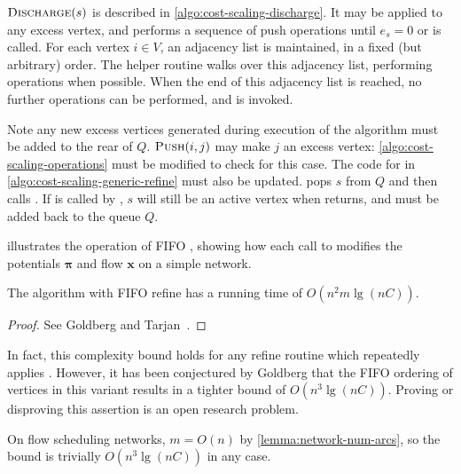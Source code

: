 $\textproc{Discharge}(s)$ is described in \cref{algo:cost-scaling-discharge}. It may be applied to any excess vertex, and performs a sequence of push operations until $e_s = 0$ or  is called. For each vertex $i \in V$, an adjacency list is maintained, in a fixed (but arbitrary) order. The helper routine  walks over this adjacency list, performing  operations when possible. When the end of this adjacency list is reached, no further  operations can be performed, and  is invoked.

Note any new excess vertices generated during execution of the algorithm must be added to the rear of $Q$. $\textproc{Push}(i,j)$ may make $j$ an excess vertex: \cref{algo:cost-scaling-operations} must be modified to check for this case. The code for  in \cref{algo:cost-scaling-generic-refine} must also be updated.  pops $s$ from $Q$ and then calls . If  is called by , $s$ will still be an active vertex when  returns, and must be added back to the queue $Q$.

 illustrates the operation of FIFO , showing how each call to  modifies the potentials $\mathbf{\pi}$ and flow $\mathbf{x}$ on a simple network.

\begin{thm} \label{thm:cost-scaling-first-active-complexity}
The algorithm with FIFO refine has a running time of $O(n^2m \lg (nC))$.
\end{thm}
\begin{proof}
See Goldberg and Tarjan~\cite[theorem~6.2]{Goldberg:1990}.
\end{proof}

\begin{remark}
In fact, this complexity bound holds for any refine routine which repeatedly applies . However, it has been conjectured by Goldberg that the FIFO ordering of vertices in this variant results in a tighter bound of $O(n^3 \lg (nC))$. Proving or disproving this assertion is an open research problem.\\
\end{remark} 

\begin{remark}
On flow scheduling networks, $m = O(n)$ by \cref{lemma:network-num-arcs}, so the bound is trivially $O(n^3 \lg (nC))$ in any case.
\end{remark}


